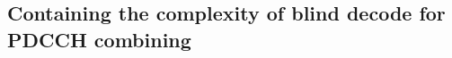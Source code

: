 \documentclass[conference,10pt]{IEEEtran}
\begin{document}

\subsection{Containing the complexity of blind decode for PDCCH combining}\label{DD}
\end{document}
